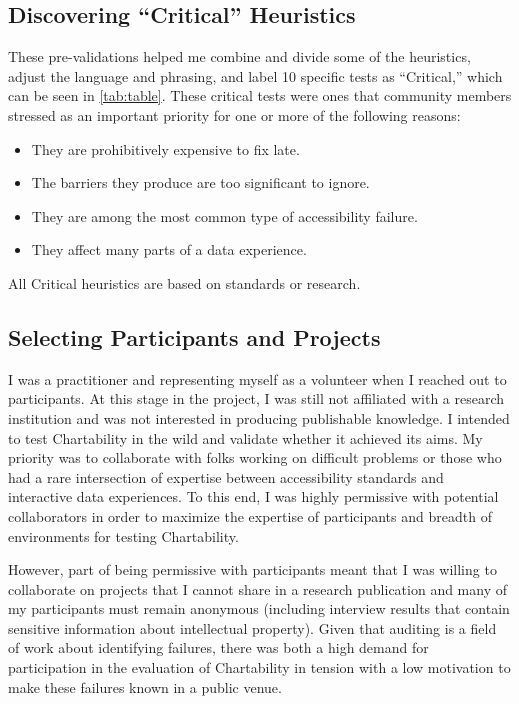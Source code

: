 \documentclass[12pt]{cmuthesis}
\begin{document}
\subsection{Discovering ``Critical'' Heuristics}
\label{sec:critical heuristics}
These pre-validations helped me combine and divide some of the heuristics, adjust the language and phrasing, and label 10 specific tests as ``Critical,'' which can be seen in \autoref{tab:table}. These critical tests were ones that community members stressed as an important priority for one or more of the following reasons:
\begin{itemize}
    \item They are prohibitively expensive to fix late.
    \item The barriers they produce are too significant to ignore.
    \item They are among the most common type of accessibility failure.
    \item They affect many parts of a data experience.
\end{itemize}

All Critical heuristics are based on standards or research.

\subsection{Selecting Participants and Projects}
I was a practitioner and representing myself as a volunteer when I reached out to participants. At this stage in the project, I was still not affiliated with a research institution and was not interested in producing publishable knowledge. I intended to test Chartability in the wild and validate whether it achieved its aims. My priority was to collaborate with folks working on difficult problems or those who had a rare intersection of expertise between accessibility standards and interactive data experiences. To this end, I was highly permissive with potential collaborators in order to maximize the expertise of participants and breadth of environments for testing Chartability. 

However, part of being permissive with participants meant that I was willing to collaborate on projects that I cannot share in a research publication and many of my participants must remain anonymous (including interview results that contain sensitive information about intellectual property). Given that auditing is a field of work about identifying failures, there was both a high demand for participation in the evaluation of Chartability in tension with a low motivation to make these failures known in a public venue.
\end{document}
